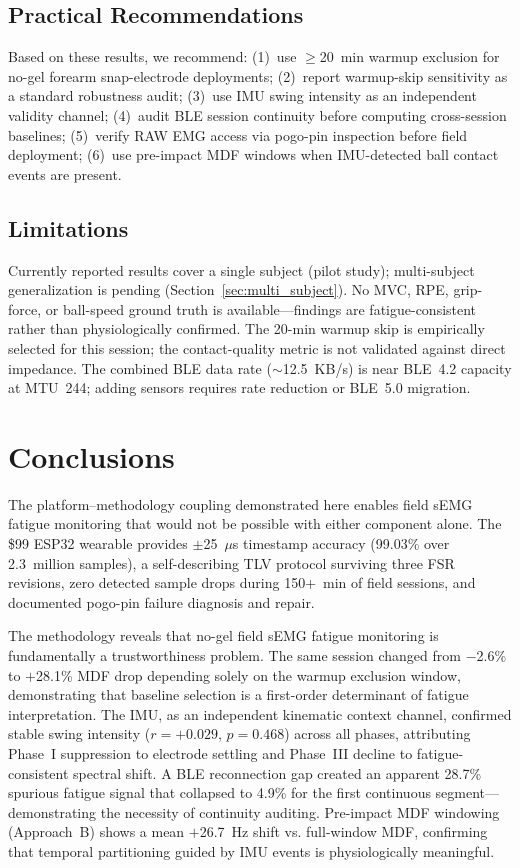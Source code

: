 \documentclass[sensors,article,submit,pdftex,moreauthors]{Definitions/mdpi}
\begin{document}
\subsection{Practical Recommendations}

Based on these results, we recommend:
(1)~use $\geq$20~min warmup exclusion for no-gel forearm snap-electrode deployments;
(2)~report warmup-skip sensitivity as a standard robustness audit;
(3)~use IMU swing intensity as an independent validity channel;
(4)~audit BLE session continuity before computing cross-session baselines;
(5)~verify RAW EMG access via pogo-pin inspection before field deployment;
(6)~use pre-impact MDF windows when IMU-detected ball contact events are present.

\subsection{Limitations}

Currently reported results cover a single subject (pilot study); multi-subject
generalization is pending (Section~\ref{sec:multi_subject}). No MVC, RPE,
grip-force, or ball-speed ground truth is available---findings are fatigue-consistent
rather than physiologically confirmed. The 20-min warmup skip is empirically selected
for this session; the contact-quality metric is not validated against direct impedance.
The combined BLE data rate ($\sim$12.5~KB/s) is near BLE~4.2 capacity at MTU~244;
adding sensors requires rate reduction or BLE~5.0 migration.

\section{Conclusions}
\label{sec:conclusions}

The platform--methodology coupling demonstrated here enables field sEMG fatigue
monitoring that would not be possible with either component alone. The \$99 ESP32
wearable provides $\pm$25~$\mu$s timestamp accuracy (99.03\% over 2.3~million samples),
a self-describing TLV protocol surviving three FSR revisions, zero detected sample
drops during 150+~min of field sessions, and documented pogo-pin failure diagnosis and
repair.

The methodology reveals that no-gel field sEMG fatigue monitoring is fundamentally a
trustworthiness problem. The same session changed from $-$2.6\% to $+$28.1\% MDF drop
depending solely on the warmup exclusion window, demonstrating that baseline selection
is a first-order determinant of fatigue interpretation. The IMU, as an independent
kinematic context channel, confirmed stable swing intensity ($r = +0.029$, $p = 0.468$)
across all phases, attributing Phase~I suppression to electrode settling and Phase~III
decline to fatigue-consistent spectral shift. A BLE reconnection gap created an apparent
28.7\% spurious fatigue signal that collapsed to 4.9\% for the first continuous
segment---demonstrating the necessity of continuity auditing. Pre-impact MDF windowing
(Approach~B) shows a mean $+$26.7~Hz shift vs. full-window MDF, confirming that
temporal partitioning guided by IMU events is physiologically meaningful.
\end{document}
